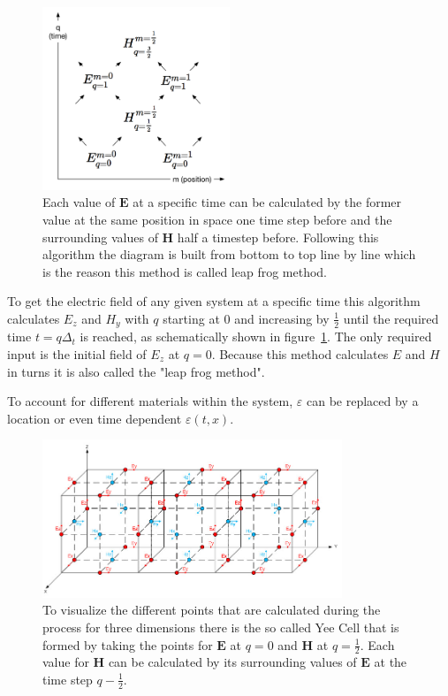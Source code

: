 \begin{figure}[!h]
  \centering
  \includegraphics[width=0.5\textwidth]{./images/space-time-cell.png}
  \caption{Each value of $\mathbf{E}$ at a specific time can be calculated by the former value at the same position in space one time step before and the surrounding values of $\mathbf{H}$ half a timestep before. Following this algorithm the diagram is built from bottom to top line by line which is the reason this method is called leap frog method.}
  \label{fig:leapfrog}
\end{figure}

To get the electric field of any given system at a specific time this algorithm calculates $E_z$ and $H_y$ with $q$ starting at 0 and increasing by $\frac{1}{2}$ until the required time $t = q\Delta_t$ is reached, as schematically shown in figure~\ref{fig:leapfrog}. The only required input is the initial field of $E_z$ at $q = 0$. Because this method calculates $E$ and $H$ in turns it is also called the "leap frog method".

To account for different materials within the system, $\varepsilon$ can be replaced by a location or even time dependent $\varepsilon(t, x)$.

\begin{figure}[!h]
  \centering
  \includegraphics[width=0.8\textwidth]{./images/yeecell.jpg}
  \caption{To visualize the different points that are calculated during the process for three dimensions there is the so called Yee Cell that is formed by taking the points for $\mathbf{E}$ at $q=0$ and $\mathbf{H}$ at $q=\frac{1}{2}$. Each value for $\mathbf{H}$ can be calculated by its surrounding values of $\mathbf{E}$ at the time step $q-\frac{1}{2}$.}
  \label{fig:yeecell}
\end{figure}

